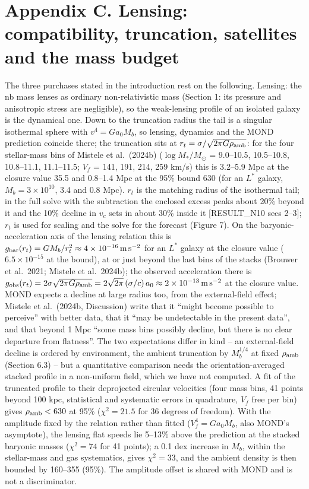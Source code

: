 \documentclass[
  10pt,
]{article}
\begin{document}
\section{Appendix C. Lensing: compatibility, truncation, satellites and the mass budget}\label{appendix-c.-lensing-compatibility-truncation-satellites-and-the-mass-budget}

The three purchases stated in the introduction rest on the following.
Lensing: the nb mass lenses as ordinary non-relativistic mass (Section 1:
its pressure and anisotropic stress are negligible), so the
weak-lensing profile of an isolated galaxy is the dynamical one. Down to
the truncation radius the tail is a singular isothermal sphere with
$v^4=G a_0 M_b$, so lensing, dynamics and the MOND prediction
coincide there; the truncation sits at $r_t=\sigma/\sqrt{2\pi G\rho_{\rm amb}}$: for the four stellar-mass bins of Mistele et al.~(2024b) ($\log M_*/M_\odot$ = 9.0--10.5, 10.5--10.8, 10.8--11.1, 11.1--11.5; $V_f$ = 141, 191, 214, 259 km/s) this is 3.2--5.9 Mpc at the closure value 35.5 and 0.8--1.4 Mpc at the 95\% bound 630 (for an $L^*$ galaxy, $M_b=3\times10^{10}$, 3.4 and 0.8 Mpc). $r_t$ is the matching radius of the isothermal tail; in the full solve with the subtraction the enclosed excess peaks about 20\% beyond it and the 10\% decline in $v_c$ sets in about 30\% inside it {[}RESULT\_N10 secs 2--3{]}; $r_t$ is used for scaling and the solve for the forecast (Figure 7). On the baryonic-acceleration axis of the lensing relation this is $g_{\rm bar}(r_t)=GM_b/r_t^2\approx 4\times10^{-16}\,{\rm m\,s^{-2}}$ for an $L^*$ galaxy at the closure value ($6.5\times10^{-15}$ at the bound), at or just beyond the last bins of the stacks (Brouwer et al.~2021; Mistele et al.~2024b); the observed acceleration there is $g_{\rm obs}(r_t)=2\sigma\sqrt{2\pi G\rho_{\rm amb}}=2\sqrt{2\pi}\,(\sigma/c)\,a_0\approx 2\times10^{-13}\,{\rm m\,s^{-2}}$ at the closure value. MOND expects a decline at large radius too, from the external-field effect; Mistele et al.~(2024b, Discussion) write that it ``might become possible to perceive'' with better data, that it ``may be undetectable in the present data'', and that beyond 1 Mpc ``some mass bins possibly decline, but there is no clear departure from flatness''. The two expectations differ in kind -- an external-field decline is ordered by environment, the ambient truncation by $M_b^{1/4}$ at fixed $\rho_{\rm amb}$ (Section 6.3) -- but a quantitative comparison needs the orientation-averaged stacked profile in a non-uniform field, which we have not computed. A fit of the truncated profile to their deprojected circular velocities (four mass bins, 41 points beyond 100 kpc, statistical and systematic errors in quadrature, $V_f$ free per bin) gives $\rho_{\rm amb}<630$ at 95\% ($\chi^2=21.5$ for 36 degrees of freedom). With the amplitude fixed by the relation rather than fitted ($V_f^4=Ga_0M_b$, also MOND's asymptote), the lensing flat speeds lie 5--13\% above the prediction at the stacked baryonic masses ($\chi^2=74$ for 41 points); a 0.1 dex increase in $M_b$, within the stellar-mass and gas systematics, gives $\chi^2=33$, and the ambient density is then bounded by 160--355 (95\%). The amplitude offset is shared with MOND and is not a discriminator. 
\end{document}
